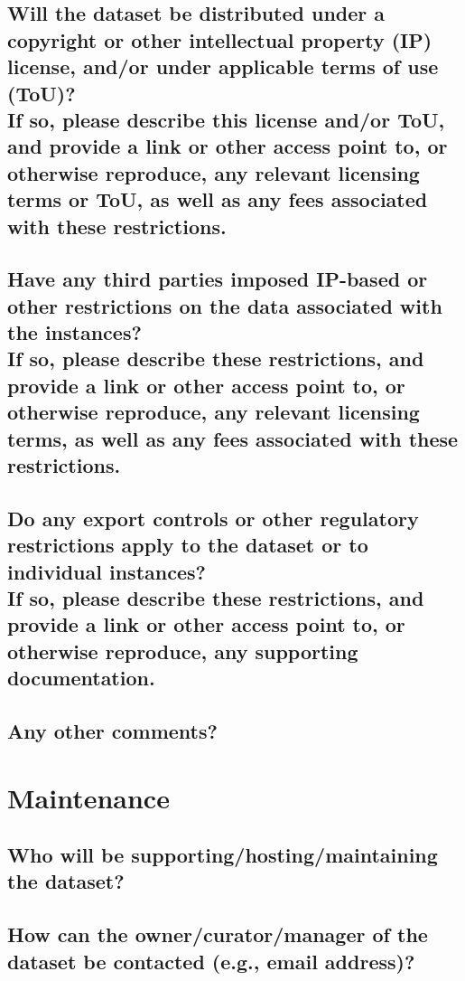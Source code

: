 \documentclass[letterpaper, 10 pt, conference]{ieeeconf}  %
\newcommand{\subtitle}[1]{{\\ \small \normalfont \color{purple} #1}}
\begin{document}
\lipsum[1]

\subsection{Will the dataset be distributed under a copyright or other intellectual property (IP) license, and/or under applicable terms of use (ToU)? \subtitle{If so, please describe this license and/or ToU, and provide a link or other access point to, or otherwise reproduce, any relevant licensing terms or ToU, as well as any fees associated with these restrictions.}}

\lipsum[1]

\subsection{Have any third parties imposed IP-based or other restrictions on the data associated with the instances? \subtitle{If so, please describe these restrictions, and provide a link or other access point to, or otherwise reproduce, any relevant licensing terms, as well as any fees associated with these restrictions.}}

\lipsum[1]

\subsection{Do any export controls or other regulatory restrictions apply to the dataset or to individual instances? \subtitle{If so, please describe these restrictions, and provide a link or other access point to, or otherwise reproduce, any supporting documentation.}}

\lipsum[1]

\subsection{Any other comments?}

\section{Maintenance}

\subsection{Who will be supporting/hosting/maintaining the dataset?}

\lipsum[1]

\subsection{How can the owner/curator/manager of the dataset be contacted (e.g., email address)?}
\end{document}
